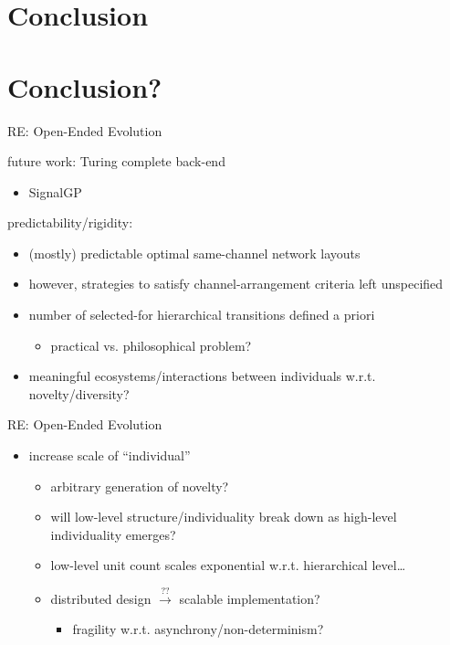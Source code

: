 \section{Conclusion}

\section{Conclusion?}

\begin{frame}{RE: Open-Ended Evolution}

future work: Turing complete back-end
\begin{itemize}
\item SignalGP \cite{lalejini2018evolving}
\end{itemize}

\pause
\vspace{2ex}

predictability/rigidity:
\begin{itemize}[<+->]
\item (mostly) predictable optimal same-channel network layouts
\item however, strategies to satisfy channel-arrangement criteria left unspecified
\item number of selected-for hierarchical transitions defined a priori
\begin{itemize}[<+->]
\item practical vs. philosophical problem?
\end{itemize}
\item meaningful ecosystems/interactions between individuals w.r.t. novelty/diversity? \cite{soros2014identifying,dolson2018evolution}
\end{itemize}

\end{frame}

\begin{frame}{RE: Open-Ended Evolution}

\begin{itemize}[<+->]
\item increase scale of ``individual''
  \begin{itemize}[<+->]
  \item arbitrary generation of novelty? \cite{banzhaf2015open}
  \item will low-level structure/individuality break down as high-level individuality emerges?
  \item low-level unit count scales exponential w.r.t. hierarchical level\dots
  \item distributed design $\stackrel{??}{\rightarrow}$ scalable implementation?
  \begin{itemize}
    \item fragility w.r.t. asynchrony/non-determinism? \cite{ackley2016indefinite}
  \end{itemize}
  \end{itemize}
\end{itemize}

\end{frame}

